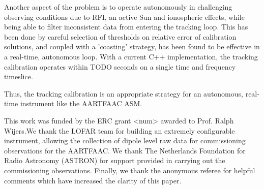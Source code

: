 \documentclass{aa}
\begin{document}
Another aspect of the problem is to operate autonomously in challenging
observing conditions due to RFI, an active Sun and ionospheric effects,
while being able to filter inconsistent data from entering the tracking
loop. This has been done by careful selection of thresholds on relative
error of calibration solutions, and coupled with a 'coasting' strategy,
has been found to be effective in a real-time, autonomous loop. With
a current C++ implementation, the tracking calibration operates within
TODO seconds on a single time and frequency timeslice.

Thus, the tracking calibration is an appropriate strategy for an autonomous,
real-time instrument like the AARTFAAC ASM.


\begin {acknowledgements}

This work was funded by the ERC grant <num> awarded to Prof. Ralph
Wijers.We thank the LOFAR team for building an extremely configurable
instrument, allowing the collection of dipole level raw data for commissioning
observations for the AARTFAAC. We thank The Netherlands Foundation
for Radio Astronomy (ASTRON) for support provided in carrying out
the commissioning observations. Finally, we thank the anonymous referee
for helpful comments which have increased the clarity of this paper.
\end{acknowledgements}


\end{document}

